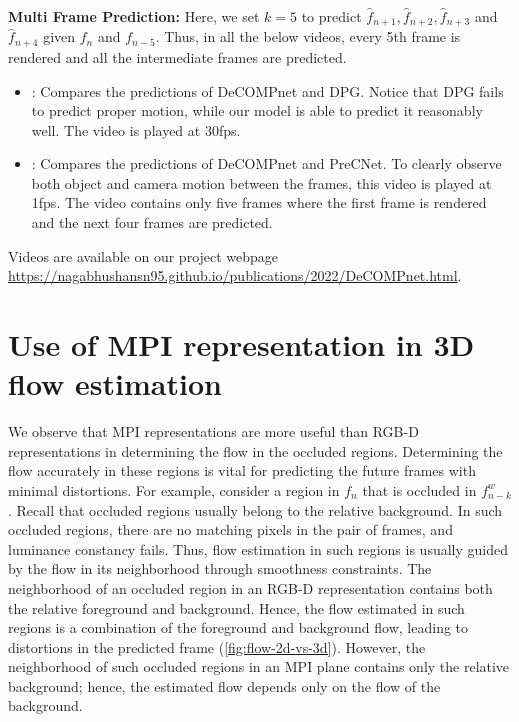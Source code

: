 \documentclass[preprint]{vgtc}
\begin{document}
    \textbf{Multi Frame Prediction:}
    Here, we set $k=5$ to predict $\hat{f}_{n+1}, \hat{f}_{n+2}, \hat{f}_{n+3}$ and $\hat{f}_{n+4}$ given $f_n$ and $f_{n-5}$.
    Thus, in all the below videos, every 5th frame is rendered and all the intermediate frames are predicted.
    \begin{itemize}
        \item {}: Compares the predictions of DeCOMPnet and DPG\@.
        Notice that DPG fails to predict proper motion, while our model is able to predict it reasonably well.
        The video is played at 30fps.
        \item {}: Compares the predictions of DeCOMPnet and PreCNet.
        To clearly observe both object and camera motion between the frames, this video is played at 1fps.
        The video contains only five frames where the first frame is rendered and the next four frames are predicted.
    \end{itemize}

Videos are available on our project webpage \url{https://nagabhushansn95.github.io/publications/2022/DeCOMPnet.html}.


    \section{Use of MPI representation in 3D flow estimation}\label{sec:mpi-flow-estimation}
    We observe that MPI representations are more useful than RGB-D representations in determining the flow in the occluded regions.
    Determining the flow accurately in these regions is vital for predicting the future frames with minimal distortions.
    For example, consider a region in $f_n$ that is occluded in $f^w_{n-k}$.
    Recall that occluded regions usually belong to the relative background.
    In such occluded regions, there are no matching pixels in the pair of frames, and luminance constancy fails.
    Thus, flow estimation in such regions is usually guided by the flow in its neighborhood through smoothness constraints.
    The neighborhood of an occluded region in an RGB-D representation contains both the relative foreground and background.
    Hence, the flow estimated in such regions is a combination of the foreground and background flow, leading to distortions in the predicted frame (\autoref{fig:flow-2d-vs-3d}).
    However, the neighborhood of such occluded regions in an MPI plane contains only the relative background;
    hence, the estimated flow depends only on the flow of the background.
\end{document}
